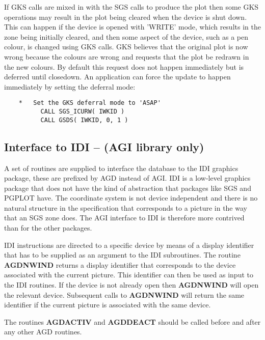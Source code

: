 \documentclass[twoside,11pt]{article}
\newcommand{\htmlref}[2]{#1}
\renewcommand{\_}{\texttt{\symbol{95}}}
\begin{document}
If GKS calls are mixed in with the SGS calls to produce the plot
then some GKS operations may result in the plot being cleared when the
device is shut down. This can happen if the device is opened with 'WRITE'
mode, which results in the zone being initially cleared, and then some
aspect of the device, such as a pen colour, is changed using GKS calls.
GKS believes that the original plot is now wrong because the colours are
wrong and requests that the plot be redrawn in the new colours.
By default this request does not happen immediately but is deferred until
closedown. An application can force the update to happen immediately by
setting the deferral mode:
\begin{verbatim}
    *   Set the GKS deferral mode to 'ASAP'
          CALL SGS_ICURW( IWKID )
          CALL GSDS( IWKID, 0, 1 )

\end{verbatim}

\subsection{Interface to IDI -- ({\bf AGI} library only)}

A set of routines are supplied to interface the database to the IDI graphics
package, these are prefixed by AGD\_ instead of AGI\_. IDI is a low-level
graphics package that does not have the kind of abstraction that packages
like SGS and PGPLOT have. The coordinate system is not device independent
and there is no natural structure in the specification that corresponds to
a picture in the way that an SGS zone does. The AGI interface to IDI is
therefore more contrived than for the other packages.

IDI instructions are directed to a specific device by means of a display
identifier that has to be supplied as an argument to the IDI subroutines.
The routine \htmlref{{\bf AGD\_NWIND}}{AGD_NWIND}
returns a display identifier that corresponds
to the device associated with the current picture. This identifier can
then be used as input to the IDI routines. If the device is not already
open then {\bf AGD\_NWIND} will open the relevant device. Subsequent calls
to {\bf AGD\_NWIND} will return the same identifier if the current picture
is associated with the same device.

The routines \htmlref{{\bf AGD\_ACTIV}}{AGD_ACTIV} and 
\htmlref{{\bf AGD\_DEACT}}{AGD_DEACT} should be called before
and after any other AGD\_ routines.
\end{document}
